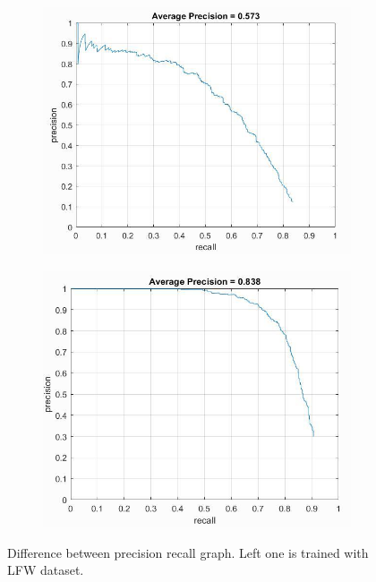 \documentclass{article}
\begin{document}
\begin{figure}[!htb]
\begin{subfigure}{.48\textwidth}
  \centering
  \includegraphics[width=.99\textwidth]{lfw.jpg}
\end{subfigure}
\begin{subfigure}{.48\textwidth}
  \centering
  \includegraphics[width=.99\textwidth]{nowarp.jpg}
\end{subfigure}
\caption{Difference between precision recall graph. Left one is trained with LFW dataset.}
\end{figure}
\end{document}
